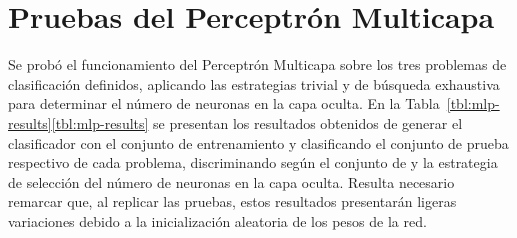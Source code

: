 %
%
%
\section{Pruebas del Perceptrón Multicapa}
%
Se probó el funcionamiento del Perceptrón Multicapa sobre los tres
problemas de clasificación definidos, aplicando las estrategias
trivial y de búsqueda exhaustiva para determinar el número de neuronas
en la capa oculta.
En la \iflatexml{}Tabla~\ref{tbl:mlp-results}\else\autoref{tbl:mlp-results}\fi{}
se presentan los resultados obtenidos de generar el clasificador con
el conjunto de entrenamiento y clasificando el conjunto de prueba
respectivo de cada problema, discriminando según el conjunto de
 y la estrategia de selección del número de neuronas en la
capa oculta.
Resulta necesario remarcar que, al replicar las pruebas, estos
resultados presentarán ligeras variaciones debido a la inicialización
aleatoria de los pesos de la red.
